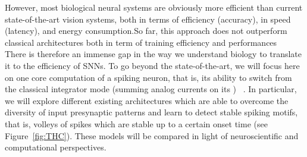 \documentclass[brainsci, %
               review,submit,pdftex,moreauthors
               ]{Definitions/mdpi}
\begin{document}
{However, most biological neural systems are obviously more efficient than current state-of-the-art vision systems, both in terms of efficiency (accuracy), in speed (latency), and energy consumption.}{So far, this approach does not outperform classical architectures both in term of training efficiency and performances}~\citep{davies_loihi_2018} There is therefore an immense gap in the way we understand biology to translate it to the efficiency of SNNs. To go beyond the state-of-the-art, we will focus here on one core computation of a spiking neuron, that is, its ability to switch from the classical integrator mode (summing analog currents on its ) ~\citep{paugam-moisy_computing_2012}. In particular, we will explore different existing architectures which are able to overcome the diversity of input presynaptic patterns and learn to detect stable spiking motifs, that is, volleys of spikes which are stable up to a certain onset time (see Figure~\ref{fig:THC}). These models will be compared in light of neuroscientific and computational perspectives. %



\end{document}
